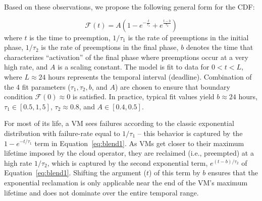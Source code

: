Based on these observations, we propose the following general form for the CDF:

\vspace*{\subsecspace}
\begin{equation}
  \label{eq:blend1}
  \boxed{
  \mathscr{F}\left(t\right) = A\left(1-e^{-\frac{t}{\tau_1}} + e^{\frac{t-b}{\tau_2}}\right)}
  \end{equation}
\noindent where $t$ is the time to preemption, $1/\tau_1$ is the rate of preemptions in the initial phase, $1/\tau_2$ is the rate of preemptions in the final phase, $b$ denotes the time that characterizes ``activation'' of the final phase where preemptions occur at a very high rate, and $A$ is a scaling constant. 
%
The model is fit to data for $0 < t < L$, where $L \approx 24$ hours represents the temporal interval (deadline).
Combination of the 4 fit parameters ($\tau_1, \tau_2, b$, and $A$) are chosen to ensure that boundary condition $\mathscr{F}(0) \approx 0$ is satisfied.
In practice, typical fit values yield $b \approx 24$ hours, $\tau_1 \in [0.5, 1,5] $, $\tau_2 \approx 0.8$, and $A \in [0.4, 0.5]$.






For most of its life, a VM sees failures according to the classic exponential distribution with failure-rate equal to $1/\tau_1$ -- this behavior is captured by the $1-e^{-t/\tau_1}$ term in Equation~\ref{eq:blend1}. 
As VMs get closer to their maximum lifetime imposed by the cloud operator, they are reclaimed (i.e., preempted) at a high rate $1/\tau_2$, which is captured by the second exponential term, $e^{(t-b)/\tau_2}$ of Equation~\ref{eq:blend1}. 
Shifting the argument ($t$) of this term by $b$ ensures that the exponential reclamation is only applicable near the end of the VM's maximum lifetime and does not dominate over the entire temporal range. 


